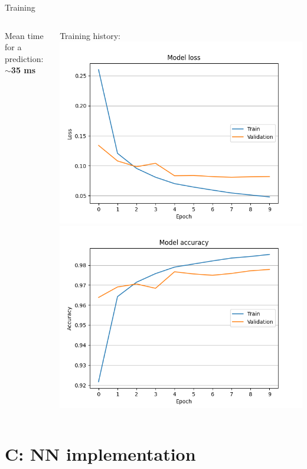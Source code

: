 \documentclass[10pt, xcolor=dvipsnames, compress]{beamer}
\begin{document}
\begin{frame}{Training}
\begin{columns}[T]
\begin{column}{.6\textwidth}
        Mean time for a prediction: \textbf{$\sim$35 ms}
    \end{column}
    \begin{column}{.4\textwidth}
        Training history:\\
        \includegraphics[width=\textwidth]{history_loss_8.png}
        \includegraphics[width=\textwidth]{history_accuracy_8.png}

    \end{column}
\end{columns}


\end{frame}

\section[C: NN implementation]{C: NN implementation}
\end{document}
